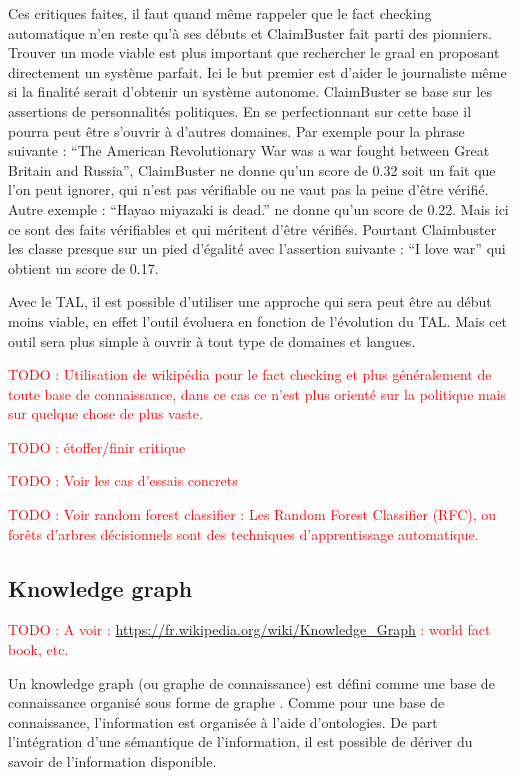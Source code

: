 \documentclass[12pt]{article}
\newcommand\todo[1]{\textcolor{red}{TODO : #1}}
\begin{document}
Ces critiques faites, il faut quand même rappeler que le fact checking automatique n'en reste qu'à ses débuts et ClaimBuster fait parti des pionniers. Trouver un mode viable est plus important que rechercher le graal en proposant directement un système parfait. Ici le but premier est d'aider le journaliste même si la finalité serait d'obtenir un système autonome. ClaimBuster se base sur les assertions de personnalités politiques. En se perfectionnant sur cette base il pourra peut être s'ouvrir à d'autres domaines. Par exemple pour la phrase suivante : \enquote{The American Revolutionary War was a war fought between Great Britain and Russia}, ClaimBuster ne donne qu'un score de 0.32 soit un fait que l'on peut ignorer, qui n'est pas vérifiable ou ne vaut pas la peine d'être vérifié. Autre exemple : \enquote{Hayao miyazaki is dead.} ne donne qu'un score de 0.22. Mais ici ce sont des faits vérifiables et qui méritent d'être vérifiés. Pourtant Claimbuster les classe presque sur un pied d'égalité avec l'assertion suivante : \enquote{I love war} qui obtient un score de 0.17. 

Avec le TAL, il est possible d'utiliser une approche qui sera peut être au début moins viable, en effet l'outil évoluera en fonction de l'évolution du TAL. Mais cet outil sera plus simple à ouvrir à tout type de domaines et langues.

\todo{Utilisation de wikipédia pour le fact checking et plus généralement de toute base de connaissance, dans ce cas ce n'est plus orienté sur la politique mais sur quelque chose de plus vaste.}

\todo{étoffer/finir critique}

\todo{Voir les cas d'essais concrets}

\todo{Voir random forest classifier : Les Random Forest Classifier (RFC), ou forêts d'arbres décisionnels sont des techniques d'apprentissage automatique.}

\subsection{Knowledge graph}

\todo{A voir : \url{https://fr.wikipedia.org/wiki/Knowledge_Graph} : world fact book, etc.}

Un knowledge graph (ou graphe de connaissance) est défini comme une base de connaissance organisé sous forme de graphe \cite{ehrlinger2016towards} \cite{JoStichburyKG}. Comme pour une base de connaissance, l'information est organisée à l'aide d'ontologies. De part l'intégration d'une sémantique de l'information, il est possible de dériver du savoir de l'information disponible. 
\end{document}
